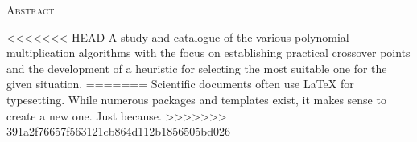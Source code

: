 \begin{center}
  \textsc{Abstract}
\end{center}
%
\noindent
%
<<<<<<< HEAD
A study and catalogue of the various polynomial multiplication algorithms with the focus on establishing practical crossover points and the development of a heuristic for selecting the most suitable one for the given situation.
=======
Scientific documents often use \LaTeX{} for typesetting. While numerous
packages and templates exist, it makes sense to create a new one. Just
because.
>>>>>>> 391a2f76657f563121cb864d112b1856505bd026
